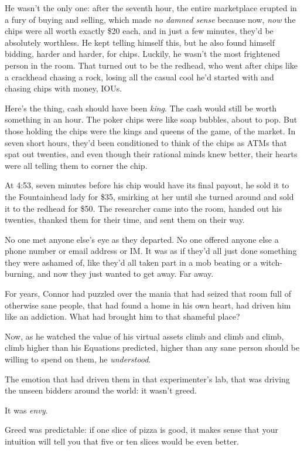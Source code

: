 He wasn't the only one: after the seventh hour, the entire
marketplace erupted in a fury of buying and selling, which made
\emph{no damned sense} because now, \emph{now} the chips were all
worth exactly \$20 each, and in just a few minutes, they'd be
absolutely worthless. He kept telling himself this, but he also
found himself bidding, harder and harder, for chips. Luckily, he
wasn't the most frightened person in the room. That turned out to
be the redhead, who went after chips like a crackhead chasing a
rock, losing all the casual cool he'd started with and chasing
chips with money, IOUs.

Here's the thing, cash should have been \emph{king}. The cash would
still be worth something in an hour. The poker chips were like soap
bubbles, about to pop. But those holding the chips were the kings
and queens of the game, of the market. In seven short hours, they'd
been conditioned to think of the chips as ATMs that spat out
twenties, and even though their rational minds knew better, their
hearts were all telling them to corner the chip.

At 4:53, seven minutes before his chip would have its final payout,
he sold it to the Fountainhead lady for \$35, smirking at her until
she turned around and sold it to the redhead for \$50. The
researcher came into the room, handed out his twenties, thanked
them for their time, and sent them on their way.

No one met anyone else's eye as they departed. No one offered
anyone else a phone number or email address or IM. It was as if
they'd all just done something they were ashamed of, like they'd
all taken part in a mob beating or a witch-burning, and now they
just wanted to get away. Far away.

For years, Connor had puzzled over the mania that had seized that
room full of otherwise sane people, that had found a home in his
own heart, had driven him like an addiction. What had brought him
to that shameful place?

Now, as he watched the value of his virtual assets climb and climb
and climb, climb higher than his Equations predicted, higher than
any sane person should be willing to spend on them, he
\emph{understood}.

The emotion that had driven them in that experimenter's lab, that
was driving the unseen bidders around the world: it wasn't greed.

It was \emph{envy}.

Greed was predictable: if one slice of pizza is good, it makes
sense that your intuition will tell you that five or ten slices
would be even better.

